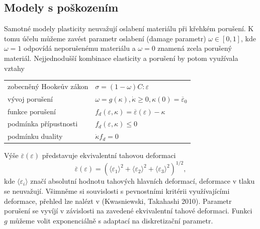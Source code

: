 \documentclass{article}
\begin{document}
\subsection{Modely s poškozením}
Samotné modely plasticity neuvažují oslabení materiálu při křehkém porušení. K tomu účelu můžeme zavést parametr oslabení (damage parametr) $\omega\in[0,1]$, kde $\omega = 1$ odpovídá neporušenému materiálu a $\omega = 0$ znamená zcela porušený materiál. Nejjednodušší kombinace elasticity a porušení by potom využívala vztahy
\begin{table}[h!]
	\centering
	\begin{tabular}{ll}
		\hline
		zobecněný Hookeův zákon & $\sigma = (1-\omega)C : \varepsilon$\\
		vývoj porušení & $\omega = g(\kappa), \dot{\kappa} \geq 0, \kappa(0) = \overline{\varepsilon}_0$\\
		funkce porušení & $f_d(\varepsilon,\kappa)=\overline{\varepsilon}(\varepsilon)-\kappa$\\
		podmínka přípustnosti & $f_d(\varepsilon,\kappa)\leq 0$ \\
		podmínku duality & $\dot{\kappa} f_d =0$\\
		\hline
	\end{tabular}
\end{table}

Výše $\overline{\varepsilon}(\varepsilon)$ představuje ekvivalentní tahovou deformaci
$$
	\overline{\varepsilon}(\varepsilon) = (\langle\varepsilon_1\rangle^2+\langle\varepsilon_2\rangle^2+\langle\varepsilon_3\rangle^2)^{1/2},
$$
kde $\langle\varepsilon_i\rangle$ značí absolutní hodnotu tahových hlavních deformací, deformace v
tlaku se neuvažují. Všimněme si souvislosti s pevnostními kritérii využívajícími deformace, přehled lze nalézt v (Kwasniewski, Takahashi 2010). Parametr porušení se vyvíjí v závislosti na zavedené ekvivalentní tahové deformaci. Funkci $g$ můžeme volit exponenciálně s adaptací na diskretizační parametr.
\end{document}
